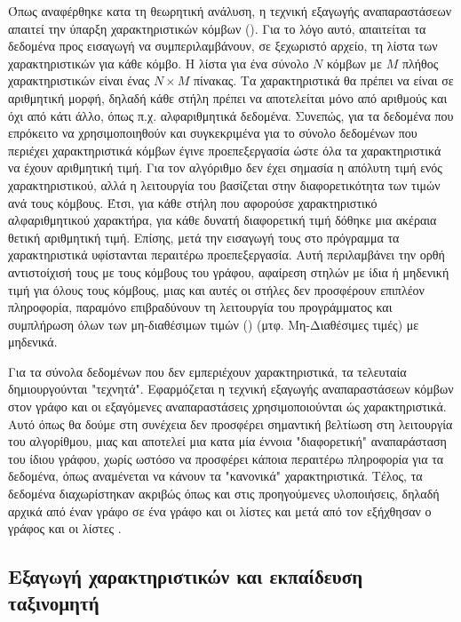 Όπως αναφέρθηκε κατα τη θεωρητική ανάλυση, η τεχνική εξαγωγής αναπαραστάσεων 
απαιτεί την ύπαρξη χαρακτηριστικών κόμβων (). Για το λόγο αυτό,
απαιτείται τα δεδομένα προς εισαγωγή να συμπεριλαμβάνουν, σε ξεχωριστό αρχείο, τη λίστα
των χαρακτηριστικών για κάθε κόμβο. Η λίστα για ένα σύνολο \(N\) κόμβων με \(M\) πλήθος
χαρακτηριστικών είναι ένας \(N \times M\) πίνακας. Τα χαρακτηριστικά θα πρέπει να είναι σε
αριθμητική μορφή, δηλαδή κάθε στήλη πρέπει να αποτελείται μόνο από αριθμούς και όχι από κάτι
άλλο, όπως π.χ. αλφαριθμητικά δεδομένα. Συνεπώς, για τα δεδομένα που επρόκειτο να χρησιμοποιηθούν και
συγκεκριμένα για το σύνολο δεδομένων  που περιέχει χαρακτηριστικά κόμβων έγινε
προεπεξεργασία ώστε όλα τα χαρακτηριστικά να έχουν αριθμητική τιμή. Για τον αλγόριθμο δεν
έχει σημασία η απόλυτη τιμή ενός χαρακτηριστικού, αλλά η λειτουργία του βασίζεται στην
διαφορετικότητα των τιμών ανά τους κόμβους. Έτσι, για κάθε στήλη που αφορούσε χαρακτηριστικό
αλφαριθμητικού χαρακτήρα, για κάθε δυνατή διαφορετική τιμή δόθηκε μια ακέραια θετική 
αριθμητική τιμή. Επίσης, μετά την εισαγωγή τους στο πρόγραμμα τα χαρακτηριστικά υφίστανται 
περαιτέρω προεπεξεργασία. Αυτή περιλαμβάνει την ορθή αντιστοίχισή τους με τους κόμβους του γράφου,
αφαίρεση στηλών με ίδια ή μηδενική τιμή για όλους τους κόμβους, μιας και αυτές οι στήλες δεν 
προσφέρουν επιπλέον πληροφορία, παραμόνο επιβραδύνουν τη λειτουργία του προγράμματος και 
συμπλήρωση όλων των μη-διαθέσιμων τιμών () (μτφ. Μη-Διαθέσιμες τιμές) 
με μηδενικά.

Για τα σύνολα δεδομένων που δεν εμπεριέχουν χαρακτηριστικά, τα τελευταία δημιουργούνται "τεχνητά".
Εφαρμόζεται η τεχνική εξαγωγής αναπαραστάσεων κόμβων  στον γράφο και οι εξαγόμενες
αναπαραστάσεις χρησιμοποιούνται ώς χαρακτηριστικά. Αυτό όπως θα δούμε στη συνέχεια δεν προσφέρει
σημαντική βελτίωση στη λειτουργία του αλγορίθμου, μιας και αποτελεί μια κατα μία έννοια 
"διαφορετική" αναπαράσταση του ίδιου γράφου, χωρίς ωστόσο να προσφέρει κάποια περαιτέρω πληροφορία
για τα δεδομένα, όπως αναμένεται να κάνουν τα "κανονικά" χαρακτηριστικά. Τέλος, τα δεδομένα
διαχωρίστηκαν ακριβώς όπως και στις προηγούμενες υλοποιήσεις, δηλαδή αρχικά από έναν γράφο  
σε ένα γράφο  και οι λίστες  και μετά από τον
 εξήχθησαν ο γράφος  και οι λίστες . 


\subsection{Εξαγωγή χαρακτηριστικών και εκπαίδευση ταξινομητή}

